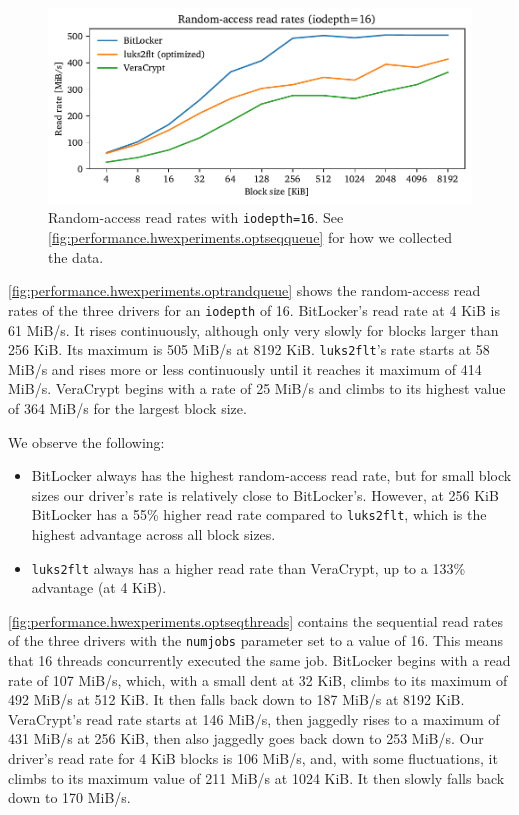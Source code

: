 \begin{figure}[htb!]
	\center
	\includegraphics[scale=1]{../fig/performance.hwexperiments.optrandqueue.pdf}
	\caption[
		Random-access read rates with \texttt{iodepth=16}
	]{
		Random-access read rates with \texttt{iodepth=16}. See \autoref{fig:performance.hwexperiments.optseqqueue} for how we collected the data.
	}
	\label{fig:performance.hwexperiments.optrandqueue}
\end{figure}

\autoref{fig:performance.hwexperiments.optrandqueue} shows the random-access read rates of the three drivers for an \texttt{iodepth} of 16. BitLocker's read rate at 4 KiB is 61 MiB/s. It rises continuously, although only very slowly for blocks larger than 256 KiB. Its maximum is 505 MiB/s at 8192 KiB. \texttt{luks2flt}'s rate starts at 58 MiB/s and rises more or less continuously until it reaches it maximum of 414 MiB/s. VeraCrypt begins with a rate of 25 MiB/s and climbs to its highest value of 364 MiB/s for the largest block size.

We observe the following:
\begin{itemize}[beginpenalty=10000]
	\item BitLocker always has the highest random-access read rate, but for small block sizes our driver's rate is relatively close to BitLocker's. However, at 256 KiB BitLocker has a 55\% higher read rate compared to \texttt{luks2flt}, which is the highest advantage across all block sizes.
	\item \texttt{luks2flt} always has a higher read rate than VeraCrypt, up to a 133\% advantage (at 4 KiB).
\end{itemize}

\autoref{fig:performance.hwexperiments.optseqthreads} contains the sequential read rates of the three drivers with the \texttt{numjobs} parameter set to a value of 16. This means that 16 threads concurrently executed the same job. BitLocker begins with a read rate of 107 MiB/s, which, with a small dent at 32 KiB, climbs to its maximum of 492 MiB/s at 512 KiB. It then falls back down to 187 MiB/s at 8192 KiB. VeraCrypt's read rate starts at 146 MiB/s, then jaggedly rises to a maximum of 431 MiB/s at 256 KiB, then also jaggedly goes back down to 253 MiB/s. Our driver's read rate for 4 KiB blocks is 106 MiB/s, and, with some fluctuations, it climbs to its maximum value of 211 MiB/s at 1024 KiB. It then slowly falls back down to 170 MiB/s.

